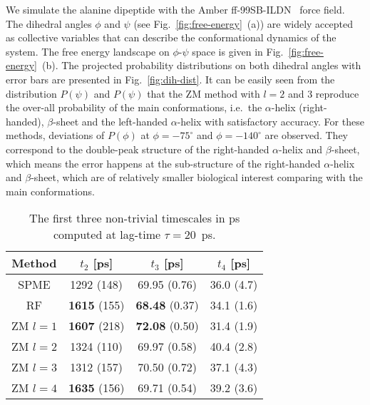 \documentclass[aip,jcp,a4paper,reprint,unsortedaddress,onecolumn,fleqn]{revtex4-1}
\begin{document}
We simulate the alanine dipeptide with the Amber
ff-99SB-ILDN~\cite{lindorff2010improved} force field.  The dihedral
angles $\phi$ and $\psi$ (see Fig.~\ref{fig:free-energy}~(a)) are
widely accepted as collective variables that can describe the
conformational dynamics of the system.  The free energy landscape
on $\phi$-$\psi$ space is given in Fig.~\ref{fig:free-energy}~(b).  The projected
probability distributions on both dihedral angles
with error bars are presented in Fig.~\ref{fig:dih-dist}. It can be easily seen
from the distribution $P(\psi)$ and $P(\psi)$ that the ZM method with
$l=2$ and 3 reproduce the over-all probability of the main
conformations, i.e.~the $\alpha$-helix (right-handed), $\beta$-sheet and
the left-handed $\alpha$-helix with satisfactory accuracy.  For these
methods, deviations of $P(\phi)$ at $\phi = -75^\circ$ and $\phi =
-140^\circ$ are observed. They correspond to the double-peak structure
of the right-handed $\alpha$-helix and $\beta$-sheet, which means the
error happens at the sub-structure of the right-handed $\alpha$-helix
and $\beta$-sheet, which are of relatively smaller biological interest
comparing with the main conformations.



\begin{table}
  \centering
  \caption{The first three non-trivial timescales in ps computed at lag-time $\tau = 20$~ps.
  }
  \begin{tabular*}{0.5\textwidth}{@{\extracolsep{\fill}}c   ccc}\hline\hline
    Method      &        $t_2$ [ps]  & $t_3$ [ps] &  $t_4$ [ps] \\\hline
    SPME        &         1292  (148)     &          69.95  (0.76)  &         36.0 (4.7)    \\
    RF          & \textbf{1615} (155)     &  \textbf{68.48} (0.37)  &         34.1 (1.6)    \\
    ZM $l=1$    & \textbf{1607} (218)     &  \textbf{72.08} (0.50)  &         31.4 (1.9)    \\
    ZM $l=2$    &         1324  (110)     &          69.97  (0.58)  &         40.4 (2.8)    \\
    ZM $l=3$    &         1312  (157)     &          70.50  (0.72)  &         37.1 (4.3)    \\
    ZM $l=4$    & \textbf{1635} (156)     &          69.71  (0.54)  &         39.2 (3.6)    \\
    \hline\hline
  \end{tabular*}
  \label{tab:tmp3}
\end{table}
\end{document}
